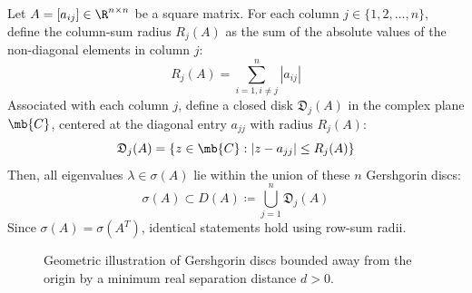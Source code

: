 \begin{theo}\label{thm:gershgorin_detailed}
Let $A = [a_{ij}] \in \R^{n \times n}$ be a square matrix. For each column $j \in \{1, 2, \dots, n\}$, define the column-sum radius $R_j(A)$ as the sum of the absolute values of the non-diagonal elements in column $j$:
\begin{equation}\label{eq:gershgorin_radius}
    R_j(A) = \sum_{i=1, i \neq j}^{n} |a_{ij}|
\end{equation}
Associated with each column $j$, define a closed disk $\mathfrak{D}_j(A)$ in the complex plane $\mb{C}$, centered at the diagonal entry $a_{jj}$ with radius $R_j(A)$:
\begin{equation}\label{eq:gershgorin_disc}
    \mathfrak{D}_j(A) = \left\{ z \in \mb{C} : |z - a_{jj}| \le R_j(A) \right\}
\end{equation}
Then, all eigenvalues $\lambda \in \sigma(A)$ lie within the union of these $n$ Gershgorin discs:
\begin{equation}
    \sigma(A) \subset D(A) \coloneqq \bigcup_{j=1}^{n} \mathfrak{D}_j(A)
\end{equation}
Since $\sigma(A) = \sigma(A^T)$, identical statements hold using row-sum radii.
\end{theo}

\begin{figure}[ht!]
    \centering
    \caption{Geometric illustration of Gershgorin discs bounded away from the origin by a minimum real separation distance $d > 0$.}
    \label{fig:gershgorin_concept}
\end{figure}

